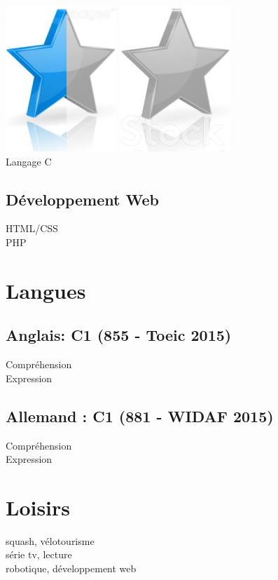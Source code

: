 \documentclass[10pt,a4paper,sans]{article}
\begin{document}
\begin{minipage}{0.23\textwidth}
    \includegraphics[scale=0.25]{img/half_star.png}
    \includegraphics[scale=0.25]{img/empty_star.png}\\
    Langage C\\
    \subsection{Développement Web}
    HTML/CSS\\
    PHP\\

    \section{Langues}
    \subsection{Anglais: C1 (855 - Toeic 2015)}
    Compréhension\\
    Expression\\
    \subsection{Allemand : C1 (881 - WIDAF 2015)}
    Compréhension\\
    Expression\\

    \section{Loisirs}
    squash, vélotourisme\\
    série tv, lecture\\
    robotique, développement web\\
\end{minipage}
\end{document}
